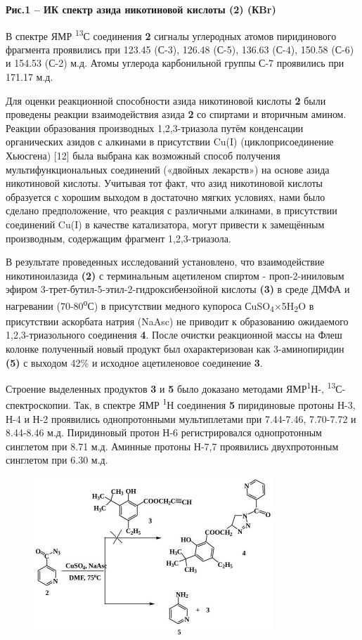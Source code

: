 {\bfseries Рис.1 -- ИК спектр азида никотиновой кислоты (2) (КBr)}

В спектре ЯМР \textsuperscript{13}С соединения {\bfseries 2} сигналы
углеродных атомов пиридинового фрагмента проявились при 123.45 (С-3),
126.48 (С-5), 136.63 (С-4), 150.58 (С-6) и 154.53 (С-2) м.д. Атомы
углерода карбонильной группы С-7 проявились при 171.17 м.д.

Для оценки реакционной способности азида никотиновой кислоты {\bfseries 2}
были проведены реакции взаимодействия азида {\bfseries 2} со спиртами и
вторичным амином. Реакции образования производных 1,2,3-триазола путём
конденсации органических азидов с алкинами в присутствии Cu(I)
(циклоприсоединение Хьюсгена) {[}12{]} была выбрана как возможный способ
получения мультифункциональных соединений («двойных лекарств») на основе
азида никотиновой кислоты. Учитывая тот факт, что азид никотиновой
кислоты образуется с хорошим выходом в достаточно мягких условиях, нами
было сделано предположение, что реакция с различными алкинами, в
присутствии соединений Cu(I) в качестве катализатора, могут привести к
замещённым производным, содержащим фрагмент 1,2,3-триазола.

В результате проведенных исследований установлено, что взаимодействие
никотиноилазида {\bfseries (2)} с терминальным ацетиленом спиртом -
проп-2-иниловым эфиром 3-трет-бутил-5-этил-2-гидроксибензойной кислоты
{\bfseries (3)} в среде ДМФА и нагревании (70-80\textsuperscript{о}С) в
присутствии медного купороса СuSO\textsubscript{4}×5H\textsubscript{2}O
в присутствии аскорбата натрия (NaAsc) не приводит к образованию
ожидаемого 1,2,3-триазольного соединения {\bfseries 4}. После очистки
реакционной массы на Флеш колонке полученный новый продукт был
охарактеризован как 3-аминопиридин {\bfseries (5)} с выходом 42\% и
исходное ацетиленовое соединение {\bfseries 3}.

Строение выделенных продуктов {\bfseries 3} и {\bfseries 5} было доказано
методами ЯМР\textsuperscript{1}Н-, \textsuperscript{13}С- спектроскопии.
Так, в спектре ЯМР \textsuperscript{1}Н соединения {\bfseries 5}
пиридиновые протоны Н-3, Н-4 и Н-2 проявились однопротонными
мультиплетами при 7.44-7.46, 7.70-7.72 и 8.44-8.46 м.д. Пиридиновый
протон Н-6 регистрировался однопротонным синглетом при 8.71 м.д. Аминные
протоны Н-7,7 проявились двухпротонным синглетом при 6.30 м.д.

\begin{figure}[H]
	\centering
	\includegraphics[width=0.8\textwidth]{assets/3}
	\caption*{}
\end{figure}


